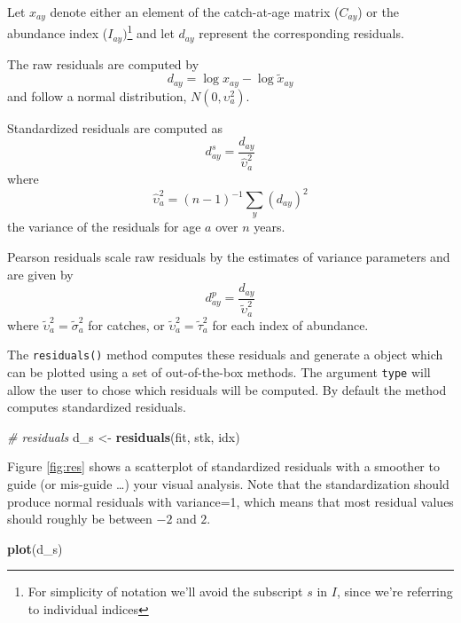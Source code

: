 \documentclass[
]{book}
\newenvironment{Shaded}{\begin{snugshade}}{\end{snugshade}}
\newcommand{\CommentTok}[1]{\textcolor[rgb]{0.56,0.35,0.01}{\textit{#1}}}
\newcommand{\FunctionTok}[1]{\textcolor[rgb]{0.13,0.29,0.53}{\textbf{#1}}}
\newcommand{\NormalTok}[1]{#1}
\newcommand{\OtherTok}[1]{\textcolor[rgb]{0.56,0.35,0.01}{#1}}
\begin{document}
Let \(x_{ay}\) denote either an element of the catch-at-age matrix (\(C_{ay}\)) or the abundance index (\(I_{ay})\)\footnote{For simplicity of notation we'll avoid the subscript $s$ in $I$, since we're referring to individual indices} and let \(d_{ay}\) represent the corresponding residuals.

The raw residuals are computed by \[d_{ay} = \log{x_{ay}} - \log{\tilde{x}_{ay}}\] and follow a normal distribution, \(N(0,\upsilon^2_{a})\).

Standardized residuals are computed as \[d^s_{ay} = \frac{d_{ay}}{\hat{\upsilon}^2_{a}}\] where \[\hat{\upsilon}^2_{a} = (n-1)^{-1} \sum_y(d_{ay})^2\] the variance of the residuals for age \(a\) over \(n\) years.

Pearson residuals scale raw residuals by the estimates of variance parameters and are given by
\[d^p_{ay} = \frac{d_{ay}}{\tilde{\upsilon}^2_{a}}\]
where \(\tilde{\upsilon}^2_{a} = \tilde{\sigma}^2_{a}\) for catches, or \(\tilde{\upsilon}^2_{a} = \tilde{\tau}^2_{a}\) for each index of abundance.

The \texttt{residuals()} method computes these residuals and generate a object which can be plotted using a set of out-of-the-box methods. The argument \texttt{type} will allow the user to chose which residuals will be computed. By default the method computes standardized residuals.

\begin{Shaded}
\begin{Highlighting}[]
\CommentTok{\# residuals}
\NormalTok{d\_s }\OtherTok{\textless{}{-}} \FunctionTok{residuals}\NormalTok{(fit, stk, idx)}
\end{Highlighting}
\end{Shaded}

Figure \ref{fig:res} shows a scatterplot of standardized residuals with a smoother to guide (or mis-guide \ldots) your visual analysis. Note that the standardization should produce normal residuals with variance=1, which means that most residual values should roughly be between \(-2\) and \(2\).

\begin{Shaded}
\begin{Highlighting}[]
\FunctionTok{plot}\NormalTok{(d\_s)}
\end{Highlighting}
\end{Shaded}
\end{document}
